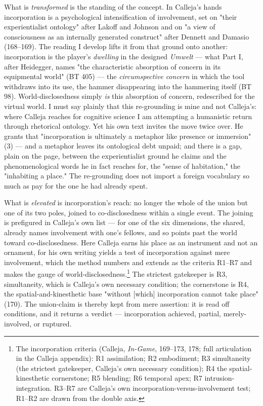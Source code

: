\documentclass{article}
\begin{document}
What is \textit{transformed} is the standing of the concept. In Calleja's hands incorporation is a psychological intensification of involvement, set on "their experientialist ontology" after Lakoff and Johnson and on "a view of consciousness as an internally generated construct" after Dennett and Damasio (168–169). The reading I develop lifts it from that ground onto another: incorporation is the player's \textit{dwelling} in the designed \textit{Umwelt} — what Part I, after Heidegger, names "the characteristic absorption of concern in its equipmental world" (BT 405) — the \textit{circumspective concern} in which the tool withdraws into its use, the hammer disappearing into the hammering itself (BT 98). World-disclosedness simply \textit{is} this absorption of concern, redescribed for the virtual world. I must say plainly that this re-grounding is mine and not Calleja's: where Calleja reaches for cognitive science I am attempting a humanistic return through rhetorical ontology. Yet his own text invites the move twice over. He grants that "incorporation is ultimately a metaphor like presence or immersion" (3) — and a metaphor leaves its ontological debt unpaid; and there is a gap, plain on the page, between the experientialist ground he claims and the phenomenological words he in fact reaches for, the "sense of habitation," the "inhabiting a place." The re-grounding does not import a foreign vocabulary so much as pay for the one he had already spent.

What is \textit{elevated} is incorporation's reach: no longer the whole of the union but one of its two poles, joined to co-disclosedness within a single event. The joining is prefigured in Calleja's own list — for one of the six dimensions, the shared, already names involvement with one's fellows, and so points past the world toward co-disclosedness. Here Calleja earns his place as an instrument and not an ornament, for his own writing yields a test of incorporation against mere involvement, which the method numbers and extends as the criteria R1–R7 and makes the gauge of world-disclosedness.\footnote{The incorporation criteria (Calleja, \textit{In-Game}, 169–173, 178; full articulation in the Calleja appendix): R1 assimilation; R2 embodiment; R3 simultaneity (the strictest gatekeeper, Calleja's own necessary condition); R4 the spatial-kinesthetic cornerstone; R5 blending; R6 temporal apex; R7 intrusion-integration. R3–R7 are Calleja's own incorporation-versus-involvement test; R1–R2 are drawn from the double axis.} The strictest gatekeeper is R3, simultaneity, which is Calleja's own necessary condition; the cornerstone is R4, the spatial-and-kinesthetic base "without [which] incorporation cannot take place" (170). The union-claim is thereby kept from mere assertion: it is read off conditions, and it returns a verdict — incorporation achieved, partial, merely-involved, or ruptured.
\end{document}

